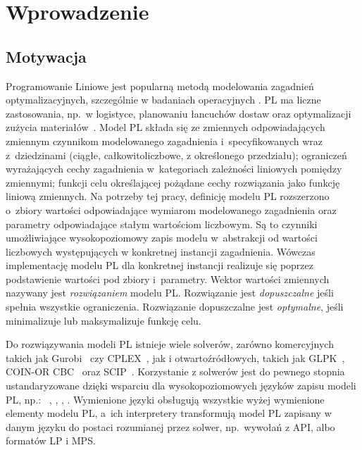 
\chapter{Wprowadzenie}\label{ch:intro}

\section{Motywacja}\label{sec:intro:motivation}

Programowanie Liniowe  jest popularną metodą modelowania zagadnień optymalizacyjnych, szczególnie w badaniach operacyjnych \cite{williams2013model}. PL ma liczne zastosowania, np.~w logistyce, planowaniu łancuchów dostaw oraz optymalizacji zużycia materiałów~\cite{dantzig2002linear}. %
Model PL składa się ze zmiennych odpowiadających zmiennym czynnikom modelowanego zagadnienia i~specyfikowanych wraz z~dziedzinami (ciągłe, całkowitoliczbowe, z określonego przedziału); ograniczeń wyrażających cechy zagadnienia w~kategoriach zależności liniowych pomiędzy zmiennymi; funkcji celu określającej pożądane cechy rozwiązania jako funkcję liniową zmiennych. Na potrzeby tej pracy, definicję modelu PL rozszerzono o~zbiory wartości odpowiadające wymiarom modelowanego zagadnienia oraz parametry odpowiadające stałym wartościom liczbowym. Są to czynniki umożliwiające wysokopoziomowy zapis modelu w~abstrakcji od wartości liczbowych występujących w konkretnej instancji zagadnienia. Wówczas implementację modelu PL dla konkretnej instancji realizuje się poprzez podstawienie wartości pod zbiory i~parametry.
Wektor wartości zmiennych nazywany jest \emph{rozwiązaniem} modelu PL. Rozwiązanie jest \emph{dopuszczalne} jeśli spełnia wszystkie ograniczenia. Rozwiązanie dopuszczalne jest \emph{optymalne}, jeśli minimalizuje lub maksymalizuje funkcję celu.

Do rozwiązywania modeli PL istnieje wiele solverów, zarówno komercyjnych takich jak Gurobi~\cite{gurobi2023} czy CPLEX~\cite{cplex2019}, jak i otwartoźródłowych, takich jak GLPK~\cite{glpk2023}, COIN-OR CBC~\cite{cbc2023} oraz SCIP~\cite{scip2023}. %
Korzystanie z solwerów jest do pewnego stopnia ustandaryzowane dzięki wsparciu dla wysokopoziomowych języków zapisu modeli PL, np.:~ \cite{fourer2003ampl},  \cite{gams2019},  \cite{zimpl_manual},  \cite{nethercote2007minizinc}. Wymienione języki obsługują wszystkie wyżej wymienione elementy modelu PL, a~ich interpretery transformują model PL zapisany w danym języku do postaci rozumianej przez solwer, np.~wywołań z API, albo formatów LP i MPS.

